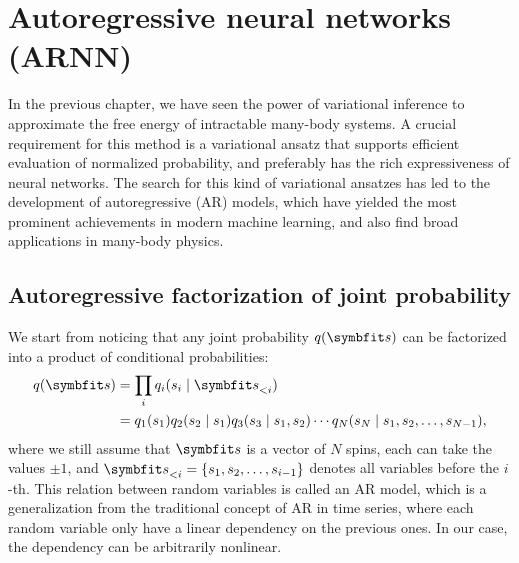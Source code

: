 \chapter{Autoregressive neural networks (ARNN)}
\label{sec:arnn}

In the previous chapter, we have seen the power of variational inference to approximate the free energy of intractable many-body systems. A crucial requirement for this method is a variational ansatz that supports efficient evaluation of normalized probability, and preferably has the rich expressiveness of neural networks. The search for this kind of variational ansatzes has led to the development of autoregressive (AR) models, which have yielded the most prominent achievements in modern machine learning, and also find broad applications in many-body physics.

\section{Autoregressive factorization of joint probability}

We start from noticing that any joint probability $q(\vs)$ can be factorized into a product of conditional probabilities:
\begin{align}
q(\vs) &= \prod_i q_i(s_i \mid \vs_{< i}) \label{eq:autoreg} \\
&= q_1(s_1) q_2(s_2 \mid s_1) q_3(s_3 \mid s_1, s_2) \cdots q_N(s_N \mid s_1, s_2, \ldots, s_{N - 1}),
\end{align}
where we still assume that $\vs$ is a vector of $N$ spins, each can take the values $\pm 1$, and $\vs_{< i} = \{s_1, s_2, \ldots, s_{i - 1}\}$ denotes all variables before the $i$-th. This relation between random variables is called an AR model, which is a generalization from the traditional concept of AR in time series, where each random variable only have a linear dependency on the previous ones. In our case, the dependency can be arbitrarily nonlinear.

